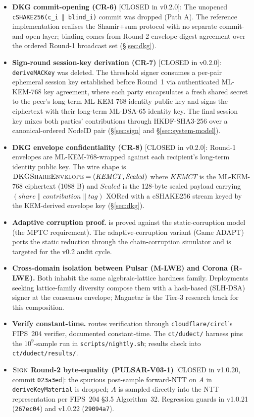 \documentclass[11pt,a4paper]{article}
\theoremstyle{definition}
\theoremstyle{remark}
\newcommand{\Sign}{\textsc{Sign}}
\begin{document}
\begin{itemize}[leftmargin=*, itemsep=0pt]
\item \textbf{DKG commit-opening (CR-6)} [CLOSED in v0.2.0]: The
unopened \texttt{cSHAKE256(c\_i $\Vert$ blind\_i)} commit was
dropped (Path A). The reference implementation realises the
Shamir+sum protocol with no separate commit-and-open layer;
binding comes from Round-2 envelope-digest agreement over the
ordered Round-1 broadcast set (\S\ref{sec:dkg}).
\item \textbf{Sign-round session-key derivation (CR-7)} [CLOSED in
v0.2.0]: \texttt{deriveMACKey} was deleted. The threshold signer
consumes a per-pair ephemeral session key established before
Round~1 via authenticated ML-KEM-768 key agreement, where each
party encapsulates a fresh shared secret to the peer's long-term
ML-KEM-768 identity public key and signs the ciphertext with their
long-term ML-DSA-65 identity key. The final session key mixes both
parties' contributions through HKDF-SHA3-256 over a
canonical-ordered NodeID pair (\S\ref{sec:sign} and
\S\ref{sec:system-model}).
\item \textbf{DKG envelope confidentiality (CR-8)} [CLOSED in v0.2.0]:
Round-1 envelopes are ML-KEM-768-wrapped against each recipient's
long-term identity public key. The wire shape is
$\textsc{DKGShareEnvelope} = (\mathit{KEMCT}, \mathit{Sealed})$
where $\mathit{KEMCT}$ is the ML-KEM-768 ciphertext (1088 B) and
$\mathit{Sealed}$ is the 128-byte sealed payload carrying
$(\mathit{share} \| \mathit{contribution} \| \mathit{tag})$ XORed
with a cSHAKE256 stream keyed by the KEM-derived envelope key
(\S\ref{sec:dkg}).
\item \textbf{Adaptive corruption proof.}
 is proved against the static-corruption
model (the MPTC requirement). The adaptive-corruption variant
(Game ADAPT) ports the static reduction through the
chain-corruption simulator and is targeted for the v0.2 audit
cycle.
\item \textbf{Cross-domain isolation between Pulsar (M-LWE) and
Corona (R-LWE).} Both inhabit the same algebraic-lattice hardness
family. Deployments seeking lattice-family diversity compose them
with a hash-based (SLH-DSA) signer at the consensus envelope;
Magnetar is the Tier-3 research track for this composition.
\item \textbf{Verify constant-time.}  routes
verification through \texttt{cloudflare/circl}'s FIPS~204
verifier, documented constant-time. The \texttt{ct/dudect/}
harness pins the $10^9$-sample run in
\texttt{scripts/nightly.sh}; results check into
\texttt{ct/dudect/results/}.
\item \textbf{$\Sign$ Round-2 byte-equality (PULSAR-V03-1)}
[CLOSED in v1.0.20, commit \texttt{023a3ed}]: the spurious
post-sample forward-NTT on $A$ in \texttt{deriveKeyMaterial} is
dropped; $A$ is sampled directly into the NTT representation per
FIPS~204 \S3.5 Algorithm~32. Regression guards in v1.0.21
(\texttt{267ec04}) and v1.0.22 (\texttt{29094a7}).
\end{itemize}
\end{document}
